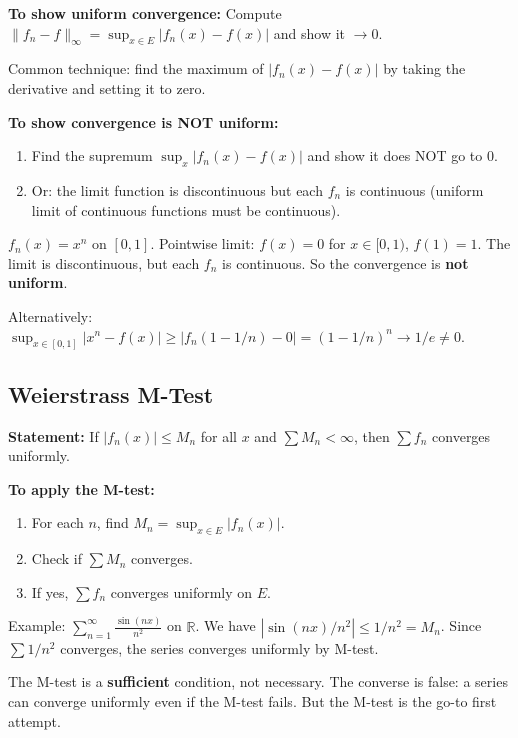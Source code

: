 \documentclass[11pt]{article}
\newcommand{\R}{\mathbb{R}}
\theoremstyle{definition}
\begin{document}
\begin{application}
\textbf{To show uniform convergence:} Compute $\|f_n - f\|_\infty = \sup_{x \in E} |f_n(x) - f(x)|$ and show it $\to 0$.

Common technique: find the maximum of $|f_n(x) - f(x)|$ by taking the derivative and setting it to zero.

\textbf{To show convergence is NOT uniform:}
\begin{enumerate}
\item Find the supremum $\sup_x |f_n(x) - f(x)|$ and show it does NOT go to $0$.
\item Or: the limit function is discontinuous but each $f_n$ is continuous (uniform limit of continuous functions must be continuous).
\end{enumerate}
\end{application}

\begin{example}
$f_n(x) = x^n$ on $[0, 1]$. Pointwise limit: $f(x) = 0$ for $x \in [0,1)$, $f(1) = 1$. The limit is discontinuous, but each $f_n$ is continuous. So the convergence is \textbf{not uniform}.

Alternatively: $\sup_{x \in [0,1]} |x^n - f(x)| \geq |f_n(1-1/n) - 0| = (1 - 1/n)^n \to 1/e \neq 0$.
\end{example}

\subsection{Weierstrass M-Test}

\textbf{Statement:} If $|f_n(x)| \leq M_n$ for all $x$ and $\sum M_n < \infty$, then $\sum f_n$ converges uniformly.

\begin{application}
\textbf{To apply the M-test:}
\begin{enumerate}
\item For each $n$, find $M_n = \sup_{x \in E} |f_n(x)|$.
\item Check if $\sum M_n$ converges.
\item If yes, $\sum f_n$ converges uniformly on $E$.
\end{enumerate}

Example: $\sum_{n=1}^\infty \frac{\sin(nx)}{n^2}$ on $\R$. We have $|\sin(nx)/n^2| \leq 1/n^2 = M_n$. Since $\sum 1/n^2$ converges, the series converges uniformly by M-test.
\end{application}

\begin{pitfall}
The M-test is a \textbf{sufficient} condition, not necessary. The converse is false: a series can converge uniformly even if the M-test fails. But the M-test is the go-to first attempt.
\end{pitfall}
\end{document}
